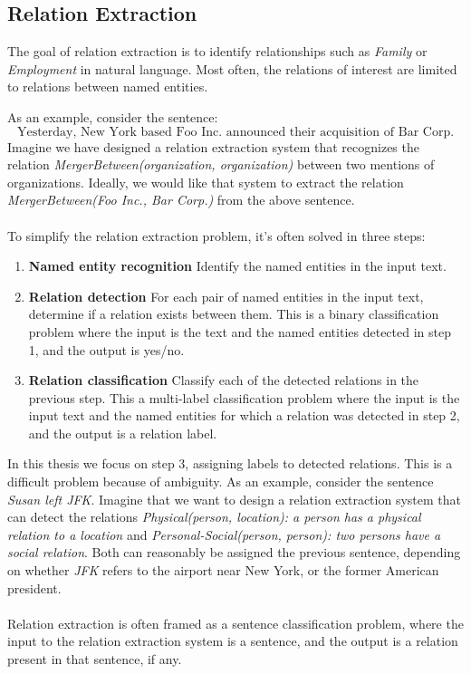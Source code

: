 \subsection{Relation Extraction}
\label{relation_extract}
The goal of relation extraction is to identify relationships such as \textit{Family} or \textit{Employment} in natural language. Most often, the relations of interest are limited to relations between named entities. 

As an example, consider the sentence: 
$$
\text{Yesterday, New York based Foo Inc. announced their acquisition of Bar Corp.}
$$ 
Imagine we have designed a relation extraction system that recognizes the relation \textit{MergerBetween(organization, organization)} between two mentions of organizations. Ideally, we would like that system to extract the relation \textit{MergerBetween(Foo Inc., Bar Corp.)} from the above sentence.
\\\\
To simplify the relation extraction problem, it's often solved in three steps:
\begin{enumerate}
	\item \textbf{Named entity recognition} \enspace Identify the named entities in the input text.
	\item \textbf{Relation detection} \enspace For each pair of named entities in the input text, determine if a relation exists between them. This is a binary classification problem where the input is the text and the named entities detected in step 1, and the output is yes/no.
	\item \textbf{Relation classification} \enspace Classify each of the detected relations in the previous step. This a multi-label classification problem where the input is the input text and the named entities for which a relation was detected in step 2, and the output is a relation label.
\end{enumerate}
In this thesis we focus on step 3, assigning labels to detected relations. This is a difficult problem because of ambiguity. As an example, consider the sentence \textit{Susan left JFK}. Imagine that we want to design a relation extraction system that can detect the relations \textit{Physical(person, location): a person has a physical relation to a location} and \textit{Personal-Social(person, person): two persons have a social relation}. Both can reasonably be assigned the previous sentence, depending on whether \textit{JFK} refers to the airport near New York, or the former American president.
\\\\
Relation extraction is often framed as a sentence classification problem, where the input to the relation extraction system is a sentence, and the output is a relation present in that sentence, if any.

